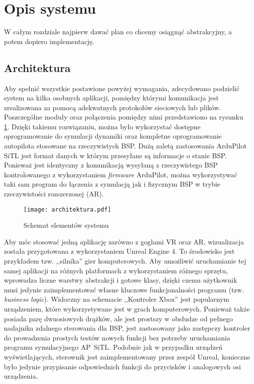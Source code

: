 \newpage
\section{Opis systemu}
\label{sec:opis}

\begin{todo}
W całym rozdziale najpierw dawać plan co chcemy osiągnąć abstrakcyjny, a potem dopiero implementację.
\end{todo}

\subsection{Architektura}
\label{sec:architektura}

Aby spełnić wszystkie postawione powyżej wymagania, zdecydowano podzielić system na kilka osobnych aplikacji, pomiędzy którymi komunikacja jest zrealizowana za pomocą adekwatnych protokołów sieciowych lub plików. Poszczególne moduły oraz połączenia pomiędzy nimi przedstawiono na rysunku \ref{fig:architektura}. Dzięki takiemu rozwiązaniu, można było wykorzystać dostępne oprogramowanie do symulacji dynamiki oraz kompletne oprogramowanie autopilota stosowane na rzeczywistych BSP. Dużą zaletą zastosowania ArduPilot SiTL\cite{soft:sitl} jest format danych w którym przesyłane są informacje o stanie BSP. Ponieważ jest identyczny z komunikacją wysyłaną z rzeczywistego BSP kontrolowanego z wykorzystaniem \emph{firmware} ArduPilot, można wykorzystywać taki sam program do łączenia z symulacją jak i fizycznym BSP w trybie rzeczywistości rozszerzonej (AR).

\begin{figure}[!h]
    \centering \texttt{[image: architektura.pdf]}
    \caption{Schemat elementów systemu}
    \label{fig:architektura}
\end{figure}

Aby móc stosować jedną aplikację zarówno z goglami VR oraz AR, wizualizacja została przygotowana z wykorzystaniem Unreal Engine 4\cite{soft:ue4}. To środowisko jest przykładem tzw. ,,silnika'' gier komputerowych. Aby umożliwić uruchamianie tej samej aplikacji na różnych platformach z wykorzystaniem różnego sprzętu, wprowadza liczne warstwy abstrakcji i gotowe klasy, dzięki czemu użytkownik musi jedynie zaimplementować własne kluczowe funkcjonalności programu (tzw. \emph{business logic}). Widoczny na schemacie ,,Kontroler Xbox'' jest popularnym urządzeniem, które wykorzystywane jest w grach komputerowych. Ponieważ także posiada parę dwuosiowych drążków, ale jest prostszy w obsłudze od pełnego nadajnika zdalnego sterowania dla BSP, jest zastosowany jako zastępczy kontroler do prowadzenia prostych testów nowych funkcji bez potrzeby uruchamiania programu symulacyjnego AP~SiTL. Podobnie jak w przypadku urządzeń wyświetlających, sterownik jest zaimplementowany przez zespół Unreal, konieczne było jedynie przypisanie odpowiednich funkcji do przycisków i analogowych osi urządzenia.

